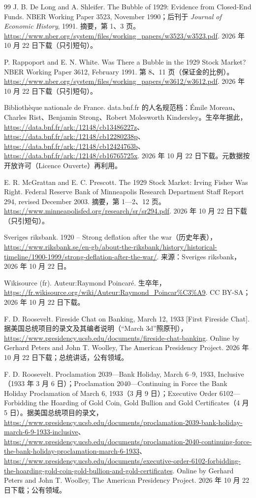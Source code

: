 \begin{thebibliography}{99}
 J. B. De Long and A. Shleifer. The Bubble of 1929: Evidence from Closed-End Funds. NBER Working Paper 3523, November 1990；后刊于 \emph{Journal of Economic History}, 1991. 摘要，第 1、3 页。\url{https://www.nber.org/system/files/working_papers/w3523/w3523.pdf}. 2026 年 10 月 22 日下载（只引短句）。

 P. Rappoport and E. N. White. Was There a Bubble in the 1929 Stock Market? NBER Working Paper 3612, February 1991. 第 8、11 页（保证金的比例）。\url{https://www.nber.org/system/files/working_papers/w3612/w3612.pdf}. 2026 年 10 月 22 日下载（只引短句）。

 Bibliothèque nationale de France. data.bnf.fr 的人名规范档：Émile Moreau、Charles Rist、Benjamin Strong、Robert Molesworth Kindersley。生卒年据此，\url{https://data.bnf.fr/ark:/12148/cb13486227z}、\url{https://data.bnf.fr/ark:/12148/cb12280238p}、\url{https://data.bnf.fr/ark:/12148/cb12424763b}、\url{https://data.bnf.fr/ark:/12148/cb16765725x}. 2026 年 10 月 22 日下载。元数据按开放许可（Licence Ouverte）再利用。

 E. R. McGrattan and E. C. Prescott. The 1929 Stock Market: Irving Fisher Was Right. Federal Reserve Bank of Minneapolis Research Department Staff Report 294, revised December 2003. 摘要，第 1—2、12 页。\url{https://www.minneapolisfed.org/research/sr/sr294.pdf}. 2026 年 10 月 22 日下载（只引短句）。

 Sveriges riksbank. 1920 -- Strong deflation after the war（历史年表），\url{https://www.riksbank.se/en-gb/about-the-riksbank/history/historical-timeline/1900-1999/strong-deflation-after-the-war/}. 来源：Sveriges riksbank，2026 年 10 月 22 日。

 Wikisource (fr). Auteur:Raymond Poincaré. 生卒年，\url{https://fr.wikisource.org/wiki/Auteur:Raymond_Poincar\%C3\%A9}. CC BY-SA；2026 年 10 月 22 日下载。

 F. D. Roosevelt. Fireside Chat on Banking, March 12, 1933 [First Fireside Chat]. 据美国总统项目的录文及其编者说明（“March 3d”照原刊），\url{https://www.presidency.ucsb.edu/documents/fireside-chat-banking}. Online by Gerhard Peters and John T. Woolley, The American Presidency Project. 2026 年 10 月 22 日下载；总统讲话，公有领域。

 F. D. Roosevelt. Proclamation 2039---Bank Holiday, March 6--9, 1933, Inclusive（1933 年 3 月 6 日）；Proclamation 2040---Continuing in Force the Bank Holiday Proclamation of March 6, 1933（3 月 9 日）；Executive Order 6102---Forbidding the Hoarding of Gold Coin, Gold Bullion and Gold Certificates（4 月 5 日）。据美国总统项目的录文，\url{https://www.presidency.ucsb.edu/documents/proclamation-2039-bank-holiday-march-6-9-1933-inclusive}、\url{https://www.presidency.ucsb.edu/documents/proclamation-2040-continuing-force-the-bank-holiday-proclamation-march-6-1933}、\url{https://www.presidency.ucsb.edu/documents/executive-order-6102-forbidding-the-hoarding-gold-coin-gold-bullion-and-gold-certificates}. Online by Gerhard Peters and John T. Woolley, The American Presidency Project. 2026 年 10 月 22 日下载；公有领域。


\end{thebibliography}

